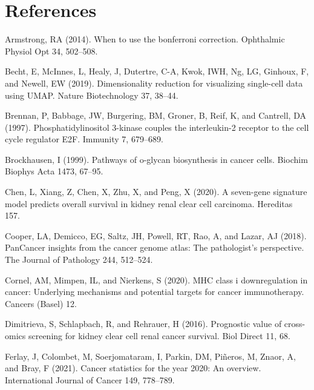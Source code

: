 \documentclass[
  parskip,
  oneside]{scrreprt}
\newlength{\cslhangindent}
\newlength{\cslentryspacingunit} %
\newenvironment{CSLReferences}[2] %
 {%
  \setlength{\parindent}{0pt}
  \ifodd #1
  \let\oldpar\par
  \def\par{\hangindent=\cslhangindent\oldpar}
  \fi
  \setlength{\parskip}{#2\cslentryspacingunit}
 }%
 {}
\begin{document}
\hypertarget{references}{%
\chapter{References}\label{references}}

\hypertarget{refs}{}
\begin{CSLReferences}{0}{0}
\leavevmode{}%
Armstrong, RA (2014). When to use the bonferroni correction. Ophthalmic
Physiol Opt 34, 502--508.

\leavevmode{}%
Becht, E, McInnes, L, Healy, J, Dutertre, C-A, Kwok, IWH, Ng, LG,
Ginhoux, F, and Newell, EW (2019). Dimensionality reduction for
visualizing single-cell data using UMAP. Nature Biotechnology 37,
38--44.

\leavevmode{}%
Brennan, P, Babbage, JW, Burgering, BM, Groner, B, Reif, K, and
Cantrell, DA (1997). Phosphatidylinositol 3-kinase couples the
interleukin-2 receptor to the cell cycle regulator E2F. Immunity 7,
679--689.

\leavevmode{}%
Brockhausen, I (1999). Pathways of o-glycan biosynthesis in cancer
cells. Biochim Biophys Acta 1473, 67--95.

\leavevmode{}%
Chen, L, Xiang, Z, Chen, X, Zhu, X, and Peng, X (2020). A seven-gene
signature model predicts overall survival in kidney renal clear cell
carcinoma. Hereditas 157.

\leavevmode{}%
Cooper, LA, Demicco, EG, Saltz, JH, Powell, RT, Rao, A, and Lazar, AJ
(2018). PanCancer insights from the cancer genome atlas: The
pathologist's perspective. The Journal of Pathology 244, 512--524.

\leavevmode{}%
Cornel, AM, Mimpen, IL, and Nierkens, S (2020). MHC class i
downregulation in cancer: Underlying mechanisms and potential targets
for cancer immunotherapy. Cancers (Basel) 12.

\leavevmode{}%
Dimitrieva, S, Schlapbach, R, and Rehrauer, H (2016). Prognostic value
of cross-omics screening for kidney clear cell renal cancer survival.
Biol Direct 11, 68.

\leavevmode{}%
Ferlay, J, Colombet, M, Soerjomataram, I, Parkin, DM, Piñeros, M, Znaor,
A, and Bray, F (2021). Cancer statistics for the year 2020: An overview.
International Journal of Cancer 149, 778--789.


\end{CSLReferences}
\end{document}
